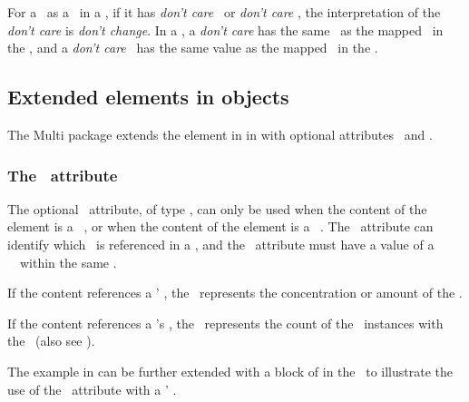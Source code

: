 For a \species\ as a \product\ in a \reaction, if it has \emph{don't care} \outwardBindingSites\ or \emph{don't care} , the interpretation of the \emph{don't care} is \emph{don't change}. In a \product, a \emph{don't care}  has the same \bindingStatusAtt\ as the mapped \outwardBindingSite\ in the \reactant, and a \emph{don't care} \speciesFeature\ has the same value as the mapped \speciesFeature\ in the \reactant.


\clearpage

\subsection{Extended  elements in  objects}
\label{def:Reaction:Math:ci}

The Multi package extends the  element in  in \ExReaction with optional attributes \speciesReferenceAtt\ and \representationTypeAtt.

\subsubsection{The \speciesReferenceAtt\ attribute}
\label{def:Reaction:Math:ci:speciesReference}

The optional \speciesReferenceAtt\ attribute, of type \SIdRefPT, can only be used when the content of the  element is a \species\ \idAtt, or when the content of the  element is a \speciesFeature\ \idAtt. The \speciesReferenceAtt\ attribute can identify which \species\ is referenced in a \reaction, and the \speciesReferenceAtt\ attribute must have a value of a \speciesReference\ \idAtt\ within the same \reaction. 

If the  content references a \species' \idAtt, the \idAtt\ represents the concentration or amount of the \species. 

If the  content references a \speciesFeature's \idAtt, the \idAtt\ represents the count of the \speciesFeature\ instances with the \speciesFeatureValue\ (also see ).  


The example in  can be further extended with a block of  in the \reaction\ to illustrate the use of the \speciesReferenceAtt\ attribute with a \species' \idAtt.

